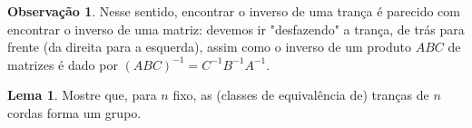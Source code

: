 \documentclass[a4paper,portuguese,11pt,twoside, leqno]{book}
\theoremstyle{definition}
\newtheorem{lemma}[theorem]{Lema}
\newtheorem{remark}{Observação}[section]
\newtheorem*{solution}{Solução}
\begin{document}
	
	
	
	
	
	\par\vspace{0.3cm} 
	
	\begin{remark}
		Nesse sentido, encontrar o inverso de uma trança é parecido com encontrar o inverso de uma matriz: devemos ir "desfazendo" a trança, de trás para frente (da direita para a esquerda), assim como o inverso de um produto $ABC$ de matrizes é dado por $(ABC)^{-1} = C^{-1}B^{-1}A^{-1}$.
	\end{remark}
	
	\par\vspace{0.3cm} 
	
	\begin{lemma}
		\label{B_n grupo}
		Mostre que, para $n$ fixo, as (classes de equivalência de) tranças de $n$ cordas forma um grupo.
	\end{lemma}
	
\end{document}
